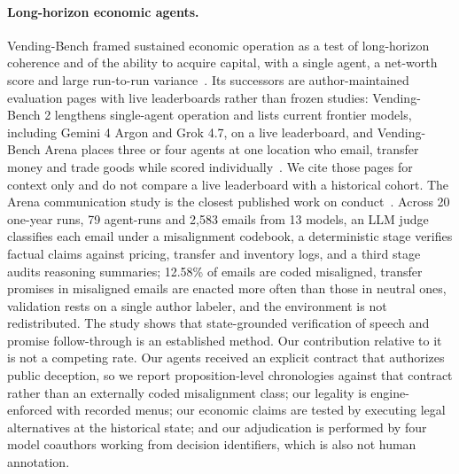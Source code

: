 \paragraph{Long-horizon economic agents.} Vending-Bench framed sustained economic operation as a test of long-horizon coherence and of the ability to acquire capital, with a single agent, a net-worth score and large run-to-run variance~\cite{backlund2025vendingbench}. Its successors are author-maintained evaluation pages with live leaderboards rather than frozen studies: Vending-Bench 2 lengthens single-agent operation and lists current frontier models, including Gemini 4 Argon and Grok 4.7, on a live leaderboard, and Vending-Bench Arena places three or four agents at one location who email, transfer money and trade goods while scored individually~\cite{andon2026vb2,andon2026arena}. We cite those pages for context only and do not compare a live leaderboard with a historical cohort. The Arena communication study is the closest published work on conduct~\cite{li2026arena}. Across 20 one-year runs, 79 agent-runs and 2,583 emails from 13 models, an LLM judge classifies each email under a misalignment codebook, a deterministic stage verifies factual claims against pricing, transfer and inventory logs, and a third stage audits reasoning summaries; 12.58\% of emails are coded misaligned, transfer promises in misaligned emails are enacted more often than those in neutral ones, validation rests on a single author labeler, and the environment is not redistributed. The study shows that state-grounded verification of speech and promise follow-through is an established method. Our contribution relative to it is not a competing rate. Our agents received an explicit contract that authorizes public deception, so we report proposition-level chronologies against that contract rather than an externally coded misalignment class; our legality is engine-enforced with recorded menus; our economic claims are tested by executing legal alternatives at the historical state; and our adjudication is performed by four model coauthors working from decision identifiers, which is also not human annotation.

